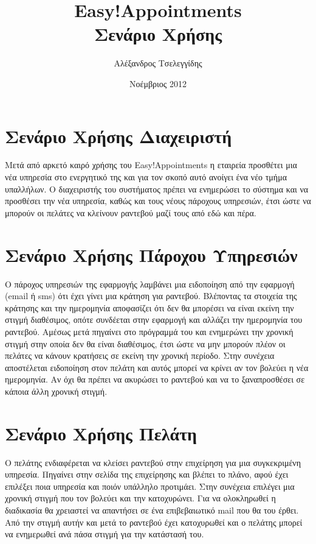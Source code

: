 \documentclass[12pt]{article}
\title{{\Huge {\bf Easy!Appointments}} \\[0.3cm] Σενάριο Χρήσης}
\author{Αλέξανδρος Τσελεγγίδης}
\date{Νοέμβριος 2012}
\begin{document}
\maketitle 
\thispagestyle{empty} %
\pagebreak

\section{Σενάριο Χρήσης Διαχειριστή}
Μετά από αρκετό καιρό χρήσης του Easy!Appointments η εταιρεία προσθέτει μια νέα υπηρεσία στο ενεργητικό της και για τον σκοπό αυτό ανοίγει ένα νέο τμήμα υπαλλήλων. Ο διαχειριστής του συστήματος πρέπει να ενημερώσει το σύστημα και να προσθέσει την νέα υπηρεσία, καθώς και τους νέους πάροχους υπηρεσιών, έτσι ώστε να μπορούν οι πελάτες να κλείνουν ραντεβού μαζί τους από εδώ και πέρα.

\section{Σενάριο Χρήσης Πάροχου Υπηρεσιών}
Ο πάροχος υπηρεσιών της εφαρμογής λαμβάνει μια ειδοποίηση από την εφαρμογή (email ή sms) ότι έχει γίνει μια κράτηση για ραντεβού. Βλέποντας τα στοιχεία της κράτησης και την ημερομηνία αποφασίζει ότι δεν θα μπορέσει να είναι εκείνη την στιγμή διαθέσιμος, οπότε συνδέεται στην εφαρμογή και αλλάζει την ημερομηνία του ραντεβού. Αμέσως μετά πηγαίνει στο πρόγραμμά του και ενημερώνει την χρονική στιγμή στην οποία δεν θα είναι διαθέσιμος, έτσι ώστε να μην μπορούν πλέον οι πελάτες να κάνουν κρατήσεις σε εκείνη την χρονική περίοδο. Στην συνέχεια αποστέλεται ειδοποίηση στον πελάτη και αυτός μπορεί να κρίνει αν τον βολεύει η νέα ημερομηνία. Αν όχι θα πρέπει να ακυρώσει το ραντεβού και να το ξαναπροσθέσει σε κάποια άλλη χρονική στιγμή. 

\section{Σενάριο Χρήσης Πελάτη}
Ο πελάτης ενδιαφέρεται να κλείσει ραντεβού στην επιχείρηση για μια συγκεκριμένη υπηρεσία. Πηγαίνει στην σελίδα της επιχείρησης και βλέπει το πλάνο, αφού έχει επιλέξει ποια υπηρεσία και ποιόν υπάλληλο προτιμάει. Στην συνέχεια επιλέγει μια χρονική στιγμή που τον βολεύει και την κατοχυρώνει. Για να ολοκληρωθεί η διαδικασία θα χρειαστεί να απαντήσει σε ένα επιβεβαιωτικό mail που θα του έρθει. Από την στιγμή αυτήν και μετά το ραντεβού έχει κατοχυρωθεί και ο πελάτης μπορεί να ενημερωθεί ανά πάσα στιγμή για την κατάστασή του.
\end{document}
